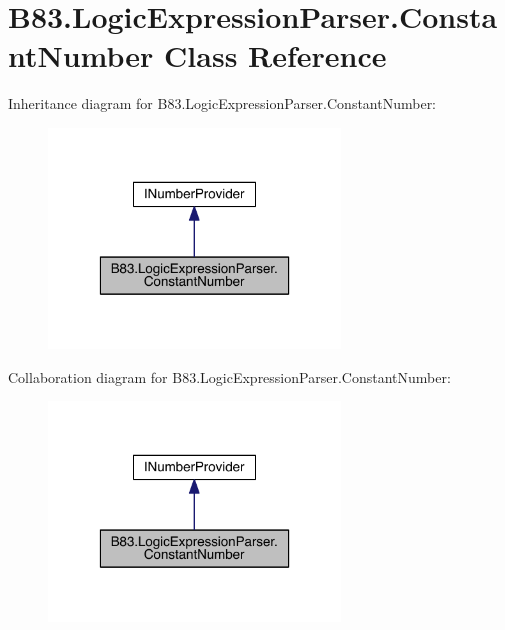 \hypertarget{class_b83_1_1_logic_expression_parser_1_1_constant_number}{}\section{B83.\+Logic\+Expression\+Parser.\+Constant\+Number Class Reference}
\label{class_b83_1_1_logic_expression_parser_1_1_constant_number}


Inheritance diagram for B83.\+Logic\+Expression\+Parser.\+Constant\+Number\+:\nopagebreak
\begin{figure}[H]
\begin{center}
\leavevmode
\includegraphics[width=220pt]{class_b83_1_1_logic_expression_parser_1_1_constant_number__inherit__graph}
\end{center}
\end{figure}


Collaboration diagram for B83.\+Logic\+Expression\+Parser.\+Constant\+Number\+:\nopagebreak
\begin{figure}[H]
\begin{center}
\leavevmode
\includegraphics[width=220pt]{class_b83_1_1_logic_expression_parser_1_1_constant_number__coll__graph}
\end{center}
\end{figure}
